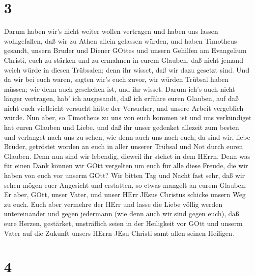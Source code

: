 \hypertarget{section-2}{%
\section{3}\label{section-2}}

 Darum haben wir's nicht weiter wollen vertragen und haben
uns lassen wohlgefallen, daß wir zu Athen allein gelassen würden,
 und haben Timotheus gesandt, unsern Bruder und Diener
GOttes und unsern Gehilfen am Evangelium Christi, euch zu stärken und zu
ermahnen in eurem Glauben,  daß nicht jemand weich würde in
diesen Trübsalen; denn ihr wisset, daß wir dazu gesetzt sind.
 Und da wir bei euch waren, sagten wir's euch zuvor, wir
würden Trübsal haben müssen; wie denn auch geschehen ist, und ihr
wisset.  Darum ich's auch nicht länger vertragen, hab' ich
ausgesandt, daß ich erführe euren Glauben, auf daß nicht euch vielleicht
versucht hätte der Versucher, und unsere Arbeit vergeblich würde.
 Nun aber, so Timotheus zu uns von euch kommen ist und uns
verkündiget hat euren Glauben und Liebe, und daß ihr unser gedenket
allezeit zum besten und verlanget nach uns zu sehen, wie denn auch uns
nach euch,  da sind wir, liebe Brüder, getröstet worden an
euch in aller unserer Trübsal und Not durch euren Glauben. 
Denn nun sind wir lebendig, dieweil ihr stehet in dem HErrn.
 Denn was für einen Dank können wir GOtt vergelten um euch
für alle diese Freude, die wir haben von euch vor unserm GOtt?
 Wir bitten Tag und Nacht fast sehr, daß wir sehen mögen
euer Angesicht und erstatten, so etwas mangelt an eurem Glauben.
 Er aber, GOtt, unser Vater, und unser HErr JEsus Christus
schicke unsern Weg zu euch.  Euch aber vermehre der HErr
und lasse die Liebe völlig werden untereinander und gegen jedermann (wie
denn auch wir sind gegen euch),  daß eure Herzen,
gestärket, unsträflich seien in der Heiligkeit vor GOtt und unserm Vater
auf die Zukunft unsers HErrn JEsu Christi samt allen seinen Heiligen.

\hypertarget{section-3}{%
\section{4}\label{section-3}}

